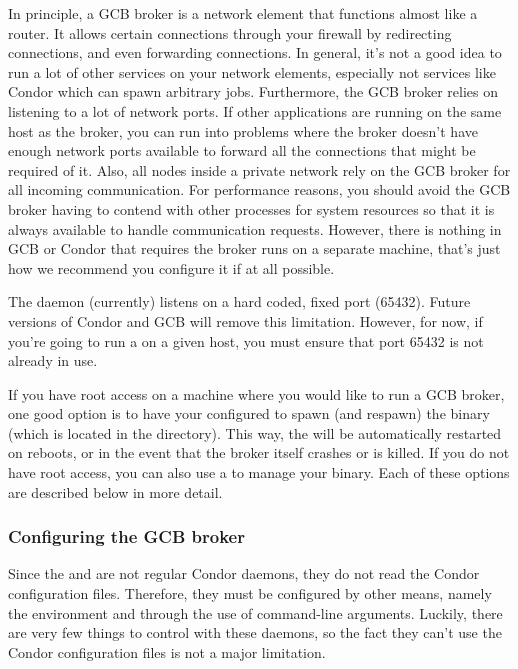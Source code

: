 In principle, a GCB broker is a network element that functions almost
like a router.
It allows certain connections through your firewall by redirecting
connections, and even forwarding connections.
In general, it's not a good idea to run a lot of other services on
your network elements, especially not services like Condor which can
spawn arbitrary jobs.
Furthermore, the GCB broker relies on listening to a lot of network
ports.
If other applications are running on the same host as the broker, you
can run into problems where the broker doesn't have enough network
ports available to forward all the connections that might be required
of it.
Also, all nodes inside a private network rely on the GCB broker for
all incoming communication.
For performance reasons, you should avoid the GCB broker having to
contend with other processes for system resources so that it is always
available to handle communication requests.
However, there is nothing in GCB or Condor that requires
the broker runs on a separate machine, that's just how we recommend
you configure it if at all possible.

The  daemon (currently) listens on a hard coded,
fixed port (65432).
Future versions of Condor and GCB will remove this limitation.
However, for now, if you're going to run a  on a
given host, you must ensure that port 65432 is not already in use.

If you have root access on a machine where you would like to run a GCB
broker, one good option is to have your  configured to
spawn (and respawn) the  binary (which is located in
the  directory).
This way, the  will be automatically restarted on
reboots, or in the event that the broker itself crashes or is killed.
If you do not have root access, you can also use a  to
manage your  binary.  Each of these options are
described below in more detail.

\subsubsection{\label{sec:GCB-Broker-Config}
Configuring the GCB broker}

Since the  and  are not
regular Condor daemons, they do not read the Condor configuration
files.
Therefore, they must be configured by other means, namely the
environment and through the use of command-line arguments.
Luckily, there are very few things to control with these daemons, so
the fact they can't use the Condor configuration files is not a major
limitation.

